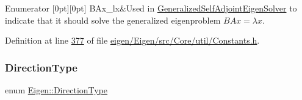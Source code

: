 \begin{DoxyEnumFields}{Enumerator}
[0pt][0pt]{}\mbox{\label{group__enums_ggae3e239fb70022eb8747994cf5d68b4a9a5b64c528c90483f0b716018cad0143f8}} 
B\+Ax\+\_\+lx&Used in \hyperlink{group___eigenvalues___module_class_eigen_1_1_generalized_self_adjoint_eigen_solver}{Generalized\+Self\+Adjoint\+Eigen\+Solver} to indicate that it should solve the generalized eigenproblem $ BAx = \lambda x $. \\
\hline

\end{DoxyEnumFields}


Definition at line \hyperlink{eigen_2_eigen_2src_2_core_2util_2_constants_8h_source_l00377}{377} of file \hyperlink{eigen_2_eigen_2src_2_core_2util_2_constants_8h_source}{eigen/\+Eigen/src/\+Core/util/\+Constants.\+h}.

\mbox{\label{group__enums_gad49a7b3738e273eb00932271b36127f7}} 
\subsubsection{\texorpdfstring{Direction\+Type}{DirectionType}\hspace{0.1cm}{\footnotesize\ttfamily [1/2]}}
{\footnotesize\ttfamily enum \hyperlink{group__enums_gad49a7b3738e273eb00932271b36127f7}{Eigen\+::\+Direction\+Type}}

